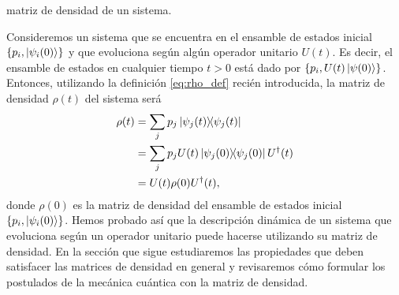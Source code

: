 matriz de densidad de un sistema.
% 
% 

Consideremos un sistema que se encuentra en el ensamble 
de estados inicial $\{ p_i, \ket{\psi_i(0)}\}$
y que evoluciona según algún operador unitario $U(t)$. Es decir, 
el ensamble de estados en cualquier tiempo $t>0$ está dado por 
$\{p_i, U(t)\ket{\psi(0)}\}$. Entonces, utilizando la definición 
\eqref{eq:rho_def} recién introducida, la matriz de
densidad $\rho(t)$ del sistema será
\begin{align} \label{eq:Rho-evolution-H}
	\rho(t) &= \sum_j p_j\dyad{\psi_j(t)}{\psi_j(t)}\nonumber\\
	&= \sum_j p_j U(t) \dyad{\psi_j(0)}{\psi_j(0)}U^{\dagger}(t)
	\nonumber\\
	&= U(t)\rho(0)U^{\dagger}(t),
\end{align}
donde $\rho(0)$ es la matriz de densidad del ensamble 
de estados inicial $\{p_i, \ket{\psi_i(0)}\}$. Hemos probado así
que la descripción dinámica de un sistema que evoluciona 
según un operador unitario puede hacerse utilizando 
su matriz de densidad. En la sección que sigue 
estudiaremos las propiedades que deben satisfacer 
las matrices de densidad en general y revisaremos cómo 
formular los postulados de la mecánica cuántica con la matriz de densidad.

